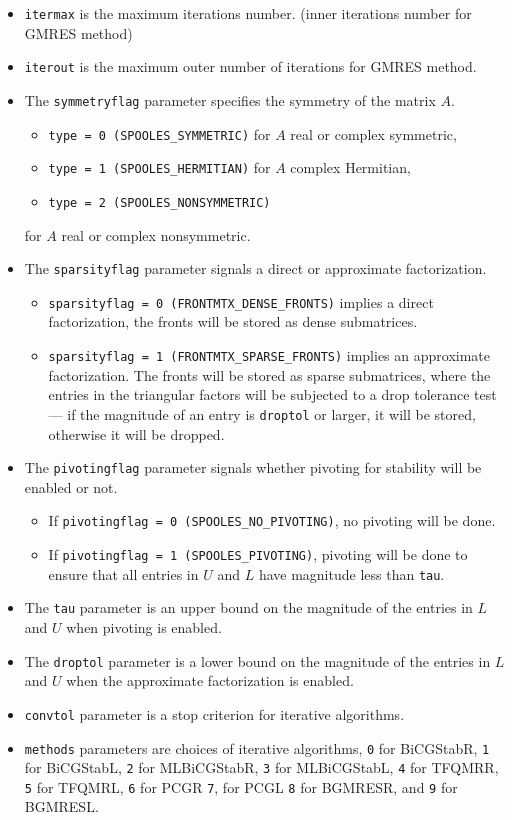 \begin{enumerate}
\begin{itemize}
{\tt Ik} is a block parameter for MLBiCGStab method.
\item
{\tt itermax} is the maximum iterations number. (inner iterations number
for GMRES method)
\item
{\tt iterout} is the maximum outer number of iterations for GMRES method.
\item
The {\tt symmetryflag} parameter specifies the symmetry of the matrix $A$.
\begin{itemize}
\item
{\tt type = 0 (SPOOLES\_SYMMETRIC)} for $A$ real or complex symmetric,
\item
{\tt type = 1 (SPOOLES\_HERMITIAN)} for $A$ complex Hermitian,
\item
{\tt type = 2 (SPOOLES\_NONSYMMETRIC)}
\end{itemize}
for $A$ real or complex nonsymmetric.
\item
The {\tt sparsityflag} parameter signals a direct or approximate
factorization.
\begin{itemize}
\item
{\tt sparsityflag = 0 (FRONTMTX\_DENSE\_FRONTS)} implies a direct
factorization, the fronts will be stored as dense submatrices.
\item
{\tt sparsityflag = 1 (FRONTMTX\_SPARSE\_FRONTS)} implies an
approximate factorization.
The fronts will be stored as sparse submatrices, where
the entries in the triangular factors will be
subjected to a drop tolerance test --- if the magnitude of an entry
is {\tt droptol} or larger, it will be stored, otherwise it will be
dropped.
\end{itemize}
\item
The {\tt pivotingflag} parameter signals whether pivoting for
stability will be enabled or not.
\begin{itemize}
\item
If {\tt pivotingflag = 0 (SPOOLES\_NO\_PIVOTING)},
no pivoting will be done.
\item
If {\tt pivotingflag = 1 (SPOOLES\_PIVOTING)},
pivoting will be done to ensure that all
entries in $U$ and $L$ have magnitude less than {\tt tau}.
\end{itemize}
\item
The {\tt tau} parameter is an upper bound on the magnitude of the
entries in $L$ and $U$ when pivoting is enabled.
\item
The {\tt droptol} parameter is a lower bound on the magnitude of the
entries in $L$ and $U$ when the approximate factorization is enabled.
\item
{\tt convtol}  parameter is a stop criterion for iterative algorithms.
\item
{\tt methods} parameters are choices of iterative algorithms,
  {\tt 0} for BiCGStabR, {\tt 1} for BiCGStabL, {\tt 2} for MLBiCGStabR,
  {\tt 3} for MLBiCGStabL, {\tt  4} for TFQMRR, {\tt 5} for TFQMRL,
  {\tt 6} for PCGR {\tt 7}, for PCGL {\tt  8} for BGMRESR, and
  {\tt 9} for BGMRESL.

\end{itemize}

\end{enumerate}

